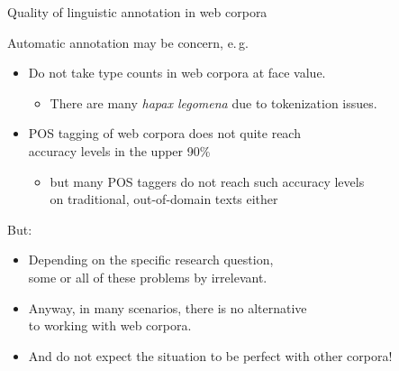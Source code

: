 %
%
%
%


\begin{frame}
  {Quality of linguistic annotation in web corpora}

Automatic annotation may be concern, e.\,g.\

\begin{itemize}
\item Do not take type counts in web corpora at face value.
  \begin{itemize}
  \item There are many \textit{hapax legomena} due to tokenization issues.
  \end{itemize}
\item POS tagging of web corpora does not quite reach\\
  accuracy levels in the upper 90\%
  \begin{itemize}
  \item but many POS taggers do not reach such accuracy levels\\
    on traditional, out-of-domain texts either
  \end{itemize}
\end{itemize}

\pause

But:

\begin{itemize}
\item Depending on the specific research question,\\
  some or all of these problems by irrelevant.
\item Anyway, in many scenarios, there is no alternative\\
  to working with web corpora.
\item \alert{And do not expect the situation to be perfect with other corpora!}
\end{itemize}

\end{frame}



